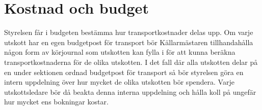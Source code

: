 \documentclass{dsekprotokoll}
\begin{document}
\section{Kostnad och budget}
Styrelsen får i budgeten bestämma hur transportkostnader delas upp. Om varje utskott har en egen budgetpost för transport bör Källarmästaren tillhandahålla någon form av körjournal som utskotten kan fylla i för att kunna beräkna transportkostnaderna för de olika utskotten. I det fall där alla utskotten delar på en under sektionen ordnad budgetpost för transport så bör styrelsen göra en intern uppdelning över hur mycket de olika utskotten bör spendera. Varje utskottsledare bör då beakta denna interna uppdelning och hålla koll på ungefär hur mycket ens bokningar kostar.\newline
\end{document}

